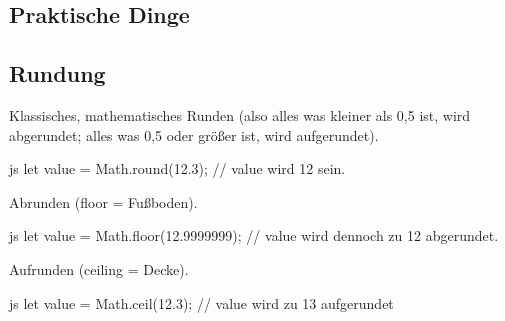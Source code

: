 \documentclass[10pt,a4paper]{article}
\begin{document}
\begin{multicols}{3}
\section*{Praktische Dinge}
\subsection*{Rundung}
Klassisches, mathematisches Runden (also alles was kleiner als 0,5 ist, wird abgerundet; alles was 0,5 oder größer ist, wird aufgerundet).
\begin{codebox}{js}{}
  let value = Math.round(12.3); // value wird 12 sein.
\end{codebox}
Abrunden (floor = Fußboden).
\begin{codebox}{js}{}
  let value = Math.floor(12.9999999); // value wird dennoch zu 12 abgerundet.
\end{codebox}
Aufrunden (ceiling = Decke).
\begin{codebox}{js}{}
  let value = Math.ceil(12.3); // value wird zu 13 aufgerundet
\end{codebox}




\printbibliography
{}
\end{multicols}
\end{document}
